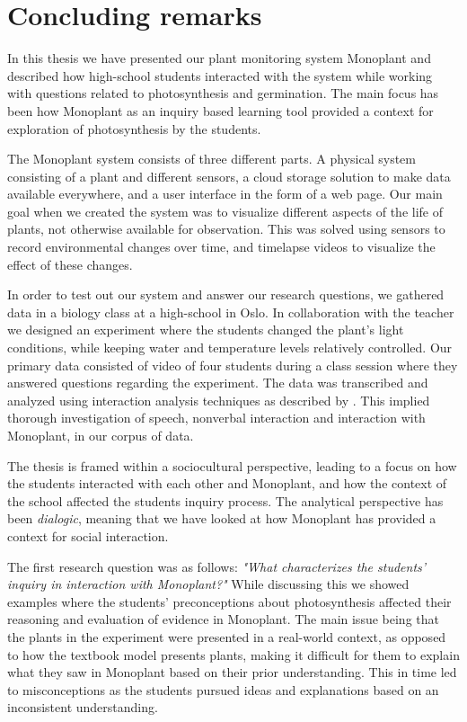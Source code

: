 \chapter{Concluding remarks}
In this thesis we have presented our plant monitoring system Monoplant and described how high-school students interacted with the system while working with questions related to photosynthesis and germination. The main focus has been how Monoplant as an inquiry based learning tool provided a context for exploration of photosynthesis by the students. 

The Monoplant system consists of three different parts. A physical system consisting of a plant and different sensors, a cloud storage solution to make data available everywhere, and a user interface in the form of a web page. Our main goal when we created the system was to visualize different aspects of the life of plants, not otherwise available for observation. This was solved using sensors to record environmental changes over time, and timelapse videos to visualize the effect of these changes. 

In order to test out our system and answer our research questions, we gathered data in a biology class at a high-school in Oslo. In collaboration with the teacher we designed an experiment where the students changed the plant's light conditions, while keeping water and temperature levels relatively controlled. Our primary data consisted of video of four students during a class session where they answered questions regarding the experiment. The data was transcribed and analyzed using interaction analysis techniques as described by \citet{jordan1995interaction}. This implied thorough investigation of speech, nonverbal interaction and interaction with Monoplant, in our corpus of data. 

The thesis is framed within a sociocultural perspective, leading to a focus on how the students interacted with each other and Monoplant, and how the context of the school affected the students inquiry process. The analytical perspective has been \emph{dialogic}, meaning that we have looked at how Monoplant has provided a context for social interaction. 

The first research question was as follows: \emph{"What characterizes the students’ inquiry in interaction with Monoplant?"} While discussing this we showed examples where the students' preconceptions about photosynthesis affected their reasoning and evaluation of evidence in Monoplant. The main issue being that the plants in the experiment were presented in a real-world context, as opposed to how the textbook model presents plants, making it difficult for them to explain what they saw in Monoplant based on their prior understanding. This in time led to misconceptions as the students pursued ideas and explanations based on an inconsistent understanding.


